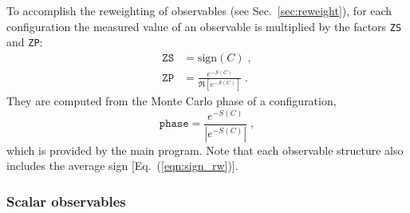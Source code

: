 To accomplish the reweighting of observables (see Sec.~\ref{sec:reweight}), for each configuration the measured value of an observable is multiplied by the factors \texttt{ZS} and \texttt{ZP}:
\begin{align}
\texttt{ZS} &= \text{sign}(C)\;, \\
\texttt{ZP} &= \frac{e^{-S(C)}} {\Re \left[e^{-S(C)} \right]}\;.
\end{align}
They are computed from the Monte Carlo phase of a configuration,
\begin{equation}\label{eqn:phase}
	\texttt{phase}   =   \frac{e^{-S(C)}}{ \left| e^{-S(C) }\right| }\;,
\end{equation}
which is provided by the main program.
Note that each observable structure also includes the average sign [Eq.~(\ref{eqn:sign_rw})].

\subsubsection{Scalar observables}

